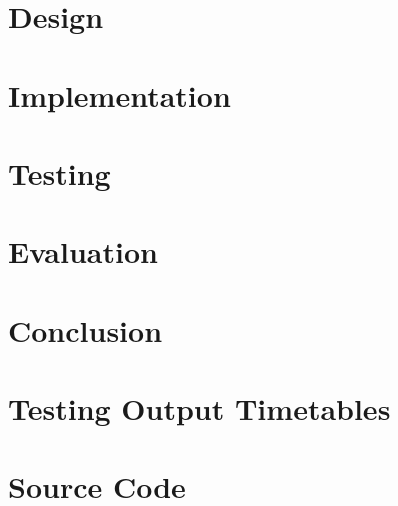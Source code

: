 \documentclass[a4paper, 12pt]{report}
\begin{document}
\chapter{Design}


\chapter{Implementation}


\chapter{Testing}  %


\chapter{Evaluation}  %

\chapter{Conclusion}  %

\renewcommand\bibname{References}


\appendix

\listoffigures

\listoftables

\listoflistings

\chapter{Testing Output Timetables}

\chapter{Source Code}

\end{document}
